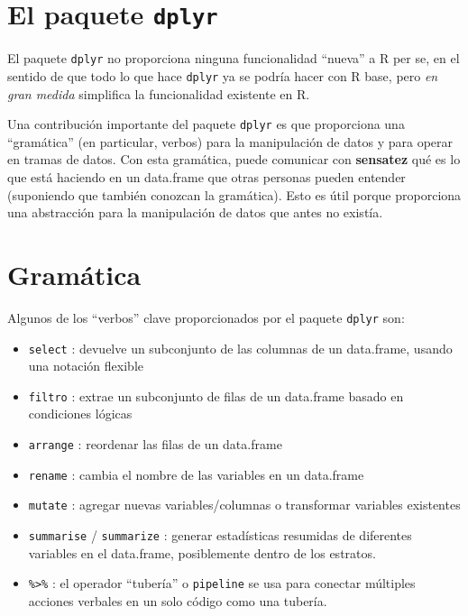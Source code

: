 \documentclass[
]{book}
\begin{document}
\hypertarget{el-paquete-dplyr}{%
\section{\texorpdfstring{El paquete \texttt{dplyr}}{El paquete dplyr}}\label{el-paquete-dplyr}}

El paquete \texttt{dplyr} no proporciona ninguna funcionalidad ``nueva'' a R per se, en el sentido de que todo lo que hace \texttt{dplyr} ya se podría hacer con R base, pero \emph{en gran medida} simplifica la funcionalidad existente en R.

Una contribución importante del paquete \texttt{dplyr} es que proporciona una ``gramática'' (en particular, verbos) para la manipulación de datos y para operar en tramas de datos. Con esta gramática, puede comunicar con \textbf{sensatez} qué es lo que está haciendo en un data.frame que otras personas pueden entender (suponiendo que también conozcan la gramática). Esto es útil porque proporciona una abstracción para la manipulación de datos que antes no existía.

\hypertarget{gramuxe1tica}{%
\section{Gramática}\label{gramuxe1tica}}

Algunos de los ``verbos'' clave proporcionados por el paquete \texttt{dplyr} son:

\begin{itemize}
\item
  \texttt{select} : devuelve un subconjunto de las columnas de un data.frame, usando una notación flexible
\item
  \texttt{filtro} : extrae un subconjunto de filas de un data.frame basado en condiciones lógicas
\item
  \texttt{arrange} : reordenar las filas de un data.frame
\item
  \texttt{rename} : cambia el nombre de las variables en un data.frame
\item
  \texttt{mutate} : agregar nuevas variables/columnas o transformar variables existentes
\item
  \texttt{summarise} / \texttt{summarize} : generar estadísticas resumidas de diferentes variables en el data.frame, posiblemente dentro de los estratos.
\item
  \texttt{\%\textgreater{}\%} : el operador ``tubería'' o \texttt{pipeline} se usa para conectar múltiples acciones verbales en un solo código como una tubería.
\end{itemize}
\end{document}
